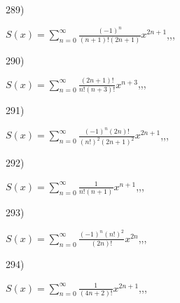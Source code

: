\documentclass[11pt, ukrainian]{article}
\begin{document}
\par
\vspace{0.9cm}
289) \space 
{%
{$S(x)=\sum\limits_{n=0}^{\infty}{\frac{(-1)^n}{(n+1)!(2n+1)}}{x^{{2n+1}}}$},,, \par \smallskip  
}
\par
\vspace{0.9cm}
290) \space 
{%
{$S(x)=\sum\limits_{n=0}^{\infty}{\frac{(2n+1)!}{n!(n+3)!}}{x^{{n+3}}}$},,, \par \smallskip  
}
\par
\newpage
291) \space 
{%
{$S(x)=\sum\limits_{n=0}^{\infty}{\frac{{(-1)^n}(2n)!}{{(n!)^2}{(2n+1)^2}}}{x^{{2n+1}}}$},,, \par \smallskip  
}
\par
\vspace{0.9cm}
292) \space 
{%
{$S(x)=\sum\limits_{n=0}^{\infty}{\frac{1}{n!(n+1)}}{x^{{n+1}}}$},,, \par \smallskip  
}
\par
\vspace{0.9cm}
293) \space 
{%
{$S(x)=\sum\limits_{n=0}^{\infty}{\frac{{(-1)^n}{(n!)^2}}{(2n)!}}{x^{{2n}}}$},,, \par \smallskip  
}
\par
\vspace{0.9cm}
294) \space 
{%
{$S(x)=\sum\limits_{n=0}^{\infty}{\frac{1}{(4n+2)!}}{x^{{2n+1}}}$},,, \par \smallskip  
}
\end{document}
